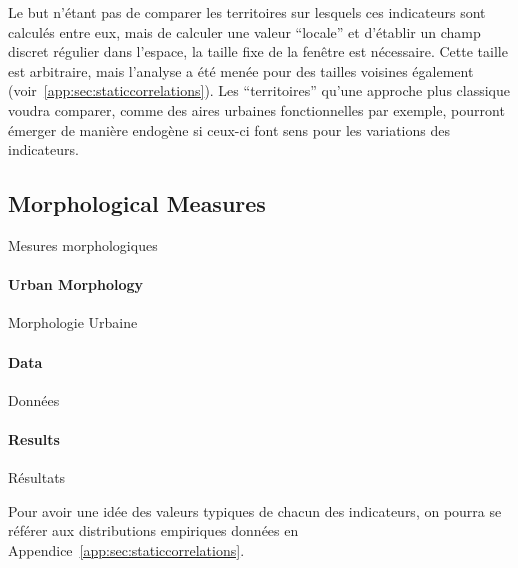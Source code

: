 Le but n'étant pas de comparer les territoires sur lesquels ces indicateurs sont calculés entre eux, mais de calculer une valeur ``locale'' et d'établir un champ discret régulier dans l'espace, la taille fixe de la fenêtre est nécessaire. Cette taille est arbitraire, mais l'analyse a été menée pour des tailles voisines également (voir~\ref{app:sec:staticcorrelations}). Les ``territoires'' qu'une approche plus classique voudra comparer, comme des aires urbaines fonctionnelles par exemple, pourront émerger de manière endogène si ceux-ci font sens pour les variations des indicateurs.





\subsection{Morphological Measures}{Mesures morphologiques}

\paragraph{Urban Morphology}{Morphologie Urbaine}





\paragraph{Data}{Données}



\paragraph{Results}{Résultats}


Pour avoir une idée des valeurs typiques de chacun des indicateurs, on pourra se référer aux distributions empiriques données en Appendice~\ref{app:sec:staticcorrelations}.




